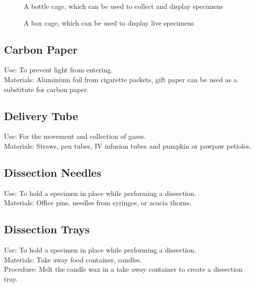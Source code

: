 \begin{figure}[H]
\begin{center}
\def\svgwidth{2.5cm}

\caption{A bottle cage, which can be used to collect and display specimens}
\label{fig:bottle-cage}
\end{center}
\end{figure}

\begin{figure}[H]
\begin{center}
\def\svgwidth{6cm}

\caption{A box cage, which can be used to display live specimens}
\label{fig:box-cage}
\end{center}
\end{figure}


\subsection*{Carbon Paper}


Use: To prevent light from entering.\\
Materials: Aluminium foil from cigarette packets, gift paper can be used as a substitute for carbon paper. \\


\subsection*{Delivery Tube}


Use: For the movement and collection of gases.\\
Materials: Straws, pen tubes, IV infusion tubes and pumpkin or pawpaw petioles.\\


\subsection*{Dissection Needles}


Use: To hold a specimen in place while performing a dissection.\\
Materials: Office pins, needles from syringes, or acacia thorns.\\


\subsection*{Dissection Trays}


Use: To hold a specimen in place while performing a dissection.\\
Materials: Take away food container, candles.\\
Procedure: Melt the candle wax in a take away container to create a dissection tray.\\


